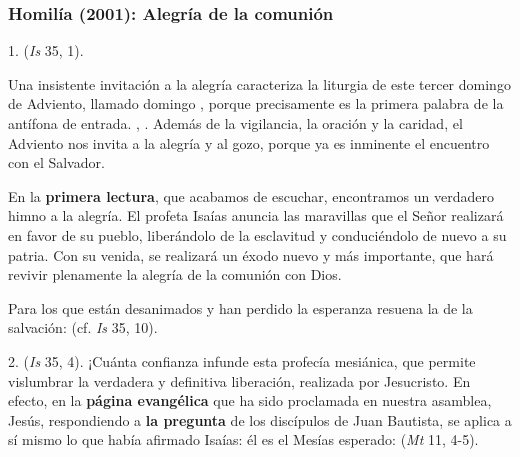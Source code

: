 			\subsubsection{Homilía (2001): Alegría de la comunión}
				
				\begin{body}
					1.  (\emph{Is} 35, 1).
					
					Una insistente invitación a la alegría caracteriza la liturgia de este tercer domingo de Adviento, llamado domingo , porque precisamente  es la primera palabra de la antífona de entrada. , . Además de la vigilancia, la oración y la caridad, el Adviento nos invita a la alegría y al gozo, porque ya es inminente el encuentro con el Salvador.
					
					En la \textbf{primera lectura}, que acabamos de escuchar, encontramos un verdadero himno a la alegría. El profeta Isaías anuncia las maravillas que el Señor realizará en favor de su pueblo, liberándolo de la esclavitud y conduciéndolo de nuevo a su patria. Con su venida, se realizará un éxodo nuevo y más importante, que hará revivir plenamente la alegría de la comunión con Dios.
					
					Para los que están desanimados y han perdido la esperanza resuena la  de la salvación:  (cf. \emph{Is} 35, 10).
					
					2.  (\emph{Is} 35, 4). ¡Cuánta confianza infunde esta profecía mesiánica, que permite vislumbrar la verdadera y definitiva liberación, realizada por Jesucristo. En efecto, en la \textbf{página evangélica} que ha sido proclamada en nuestra asamblea, Jesús, respondiendo a \textbf{la pregunta} de los discípulos de Juan Bautista, se aplica a sí mismo lo que había afirmado Isaías: él es el Mesías esperado:  (\emph{Mt} 11, 4-5).
					

\end{body}
